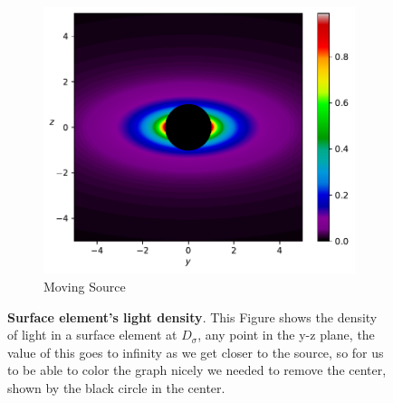 \begin{figure}[H]
\begin{subfigure}{0.45\textwidth}
		\includegraphics[width=\textwidth]{images/pdf/Rate_of_Change_of_Vector_Density_of_Light_from_Moving_Source.pdf}
		\caption{Moving Source}
		\label{subfig_2: light emitted from a source's rate of change of vector density}
	\end{subfigure}
	\caption{\textbf{Surface element's light density}. This Figure shows the density of light in a surface element at $D_\sigma$, any point in the y-z plane, the value of this goes to infinity as we get closer to the source, so for us to be able to color the graph nicely we needed to remove the center, shown by the black circle in the center.}
	\label{fig: light emitted from a source's rate of change of vector density}
\end{figure}




